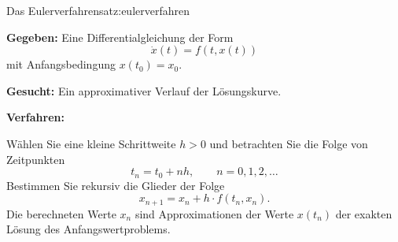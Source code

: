 \begin{satz}{Das Eulerverfahren}{satz:eulerverfahren}

    \textbf{Gegeben:} Eine Differentialgleichung der Form
    \[
        \dot{x}(t)=f(t,x(t))
    \]
    mit Anfangsbedingung \(x(t_0)=x_0\).

    \textbf{Gesucht:} Ein approximativer Verlauf der Lösungskurve.

    \medskip
    \textbf{Verfahren:}

    Wählen Sie eine kleine Schrittweite \(h>0\) und betrachten
    Sie die Folge von Zeitpunkten
    \[
        t_n=t_0+nh,\qquad n=0,1,2,\ldots
    \]
    Bestimmen Sie rekursiv die Glieder der Folge
    \[
        \boxed{x_{n+1}=x_n+h\cdot f(t_n,x_n).}
    \]
    Die berechneten Werte \(x_n\) sind Approximationen
    der Werte \(x(t_n)\) der exakten Lösung des
    Anfangswertproblems.

    \begin{center}
    \end{center}

\end{satz}
